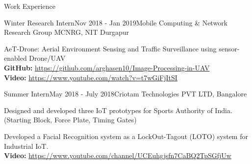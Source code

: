 \documentclass{resume} %
\begin{document}
\begin{rSection}{Work Experience}
		\begin{rSubsection}{Winter Research Intern}{Nov 2018 - Jan 2019}{Mobile Computing \& Network Research Group MCNRG, NIT Durgapur}{}{}
				\item AeT-Drone: Aerial Environment Sensing and Traffic Surveillance using sensor-enabled Drone/UAV\\
								\textbf{GitHub:} \url{https://github.com/arghasen10/Image-Processing-in-UAV} \\
				\textbf{Video:} \url{https://www.youtube.com/watch?v=t7wGiFjItSI}
		\end{rSubsection}
		
		\begin{rSubsection}{Summer Intern}{May 2018 - July 2018}{Criotam Technologies PVT LTD, Bangalore}{}{}
		
				\item Designed and developed three IoT prototypes for Sports Authority of India. (Starting Block, Force Plate, Timing Gates)
				\item Developed a Facial Recognition system as a LockOut-Tagout (LOTO)
				system for Industrial IoT. \\
				\textbf{Video:} \url{https://www.youtube.com/channel/UCEuhgjsfn7CaBQ2TpSGfjUw}
		
		\end{rSubsection}
		
	\end{rSection}
	
	
	
	
\end{document}
